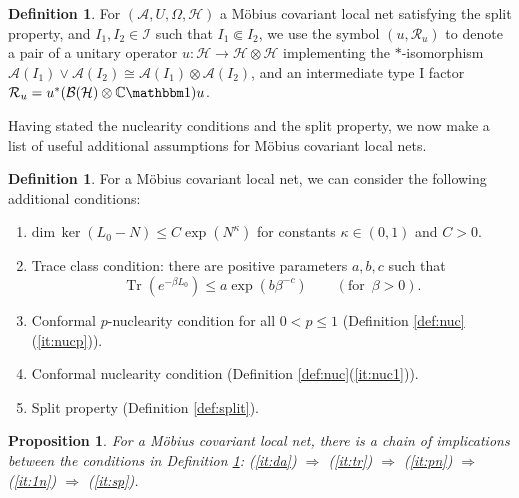 \documentclass[a4paper,12pt]{article}
\theoremstyle{plain}
\newtheorem{prop}[theo]{Proposition}
\theoremstyle{definition}
\newtheorem{defi}[theo]{Definition}
\theoremstyle{remark}
\def\CC{{\mathbb C}}
\def\A{{\mathcal A}}
\def\B{{\mathcal B}}
\def\H{{\mathcal H}}
\def\R{{\mathcal R}}
\def\R{{\mathcal R}}
\def\dim{\mathrm{dim}\,}
\def\1{{\mathbbm 1}}
\DeclareMathOperator{\Tr}{Tr}
\begin{document}
\begin{defi}\label{def:ursplit}
  For $(\A,U,\Omega,\mathcal{H})$ a M\"obius covariant local net satisfying the split property, and $I_1, I_2 \in \mathcal{I}$
  such that $I_1 \Subset I_2$, we use the symbol $(u,\R_u)$ to denote a pair of a unitary operator
  $u:\mathcal{H}\to\mathcal{H}\otimes\mathcal{H}$ implementing the $*$-isomorphism $\A(I_1)\vee\A(I_2) \cong \A(I_1)\otimes\A(I_2)$,
  and an intermediate type I factor $\R_u = u^*(\B(\H)\otimes \CC\1)u$.
\end{defi}

Having stated the nuclearity conditions and the split property,
we now make a list of useful additional assumptions for M\"obius covariant local nets.

\begin{defi}\label{def:ea} For a M\"obius covariant local net, we can consider the following additional conditions:
  \begin{enumerate}
  \item \label{it:da} $\dim \ker (L_0-N)\le C\exp(N^\kappa)$ for constants $\kappa \in (0,1)$ and $C > 0$.
  \item \label{it:tr} Trace class condition: there are positive parameters $a,b,c$ such that \[ \Tr(e^{-\beta L_0}) \le a\exp\left(b\beta^{-c}\right) \qquad (\textrm{for } \, \beta > 0).\]
  \item \label{it:pn} Conformal $p$-nuclearity condition for all $0 < p \le 1$ (Definition \ref{def:nuc}(\ref{it:nucp})).
  \item \label{it:1n} Conformal nuclearity condition (Definition \ref{def:nuc}(\ref{it:nuc1})).
  \item \label{it:sp} Split property (Definition \ref{def:split}).
  \end{enumerate}
\end{defi}

\begin{prop}\label{pro:ea} For a M\"obius covariant local net, there is a chain of implications between
the conditions in Definition \ref{def:ea}: %
(\ref{it:da}) $\Rightarrow$ (\ref{it:tr}) $\Rightarrow$ (\ref{it:pn}) $\Rightarrow$ (\ref{it:1n}) $\Rightarrow$ (\ref{it:sp}).
\end{prop}
\end{document}
